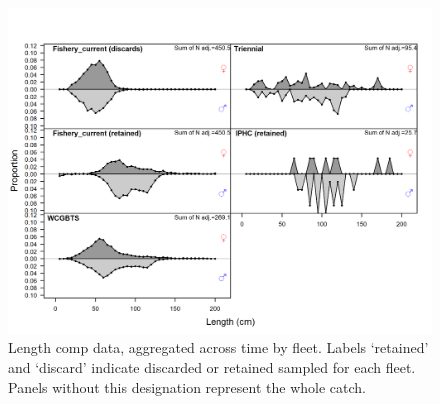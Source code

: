 \documentclass[12pt,]{article}
\begin{document}
\FloatBarrier

\FloatBarrier

\FloatBarrier

\FloatBarrier

\FloatBarrier

\FloatBarrier

\FloatBarrier

\newpage

\begin{figure}
\centering
\includegraphics{r4ss/plots_mod1/comp_lendat__aggregated_across_time.png}
\caption{Length comp data, aggregated across time by fleet. Labels
`retained' and `discard' indicate discarded or retained sampled for each
fleet. Panels without this designation represent the whole catch.
\label{fig:comp_lendat_aggregated_across_time}}
\end{figure}

\newpage

\FloatBarrier

\FloatBarrier

\FloatBarrier

\FloatBarrier
\end{document}
